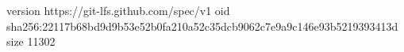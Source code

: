 version https://git-lfs.github.com/spec/v1
oid sha256:22117b68bd9d9b53e52b0fa210a52c35dcb9062c7e9a9c146e93b5219393413d
size 11302

